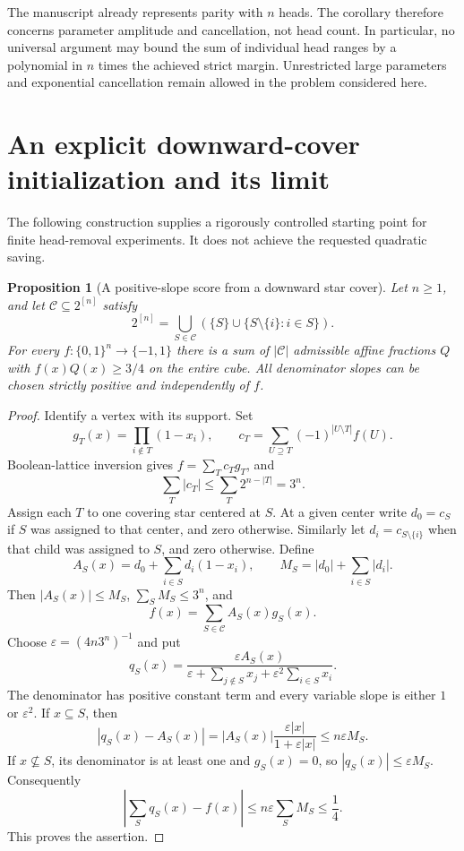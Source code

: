 \documentclass[11pt]{article}
\newtheorem{proposition}{Proposition}
\begin{document}
The manuscript already represents parity with $n$ heads. The corollary
therefore concerns parameter amplitude and cancellation, not head count.
In particular, no universal argument may bound the sum of individual
head ranges by a polynomial in $n$ times the achieved strict margin.
Unrestricted large parameters and exponential cancellation remain allowed
in the problem considered here.

\section{An explicit downward-cover initialization and its limit}

The following construction supplies a rigorously controlled starting point
for finite head-removal experiments. It does not achieve the requested
quadratic saving.

\begin{proposition}[A positive-slope score from a downward star cover]
Let $n\geq1$, and let $\mathcal C\subseteq2^{[n]}$ satisfy
\[
 2^{[n]}=\bigcup_{S\in\mathcal C}
       \left(\{S\}\cup\{S\setminus\{i\}:i\in S\}\right).
\]
For every $f:\{0,1\}^n\longrightarrow\{-1,1\}$ there is a sum
of $|\mathcal C|$ admissible affine fractions $Q$ with
$f(x)Q(x)\geq3/4$ on the entire cube. All denominator slopes
can be chosen strictly positive and independently of $f$.
\end{proposition}

\begin{proof}
Identify a vertex with its support. Set
\[
 g_T(x)=\prod_{i\notin T}(1-x_i),\qquad
 c_T=\sum_{U\supseteq T}(-1)^{|U\setminus T|}f(U).
\]
Boolean-lattice inversion gives $f=\sum_Tc_Tg_T$, and
\[
 \sum_T|c_T|\leq\sum_T2^{n-|T|}=3^n.
\]
Assign each $T$ to one covering star centered at $S$. At a given
center write $d_0=c_S$ if $S$ was assigned to that center, and zero
otherwise. Similarly let $d_i=c_{S\setminus\{i\}}$ when that child
was assigned to $S$, and zero otherwise. Define
\[
 A_S(x)=d_0+\sum_{i\in S}d_i(1-x_i),\qquad
 M_S=|d_0|+\sum_{i\in S}|d_i|.
\]
Then $|A_S(x)|\leq M_S$, $\sum_SM_S\leq3^n$, and
\[
 f(x)=\sum_{S\in\mathcal C} A_S(x)g_S(x).
\]
Choose $\varepsilon=(4n3^n)^{-1}$ and put
\[
 q_S(x)=\frac{\varepsilon A_S(x)}
 {\varepsilon+\sum_{j\notin S}x_j+
                     \varepsilon^2\sum_{i\in S}x_i}.
\]
The denominator has positive constant term and every variable slope
is either $1$ or $\varepsilon^2$. If $x\subseteq S$, then
\[
 |q_S(x)-A_S(x)|
 =|A_S(x)|\frac{\varepsilon|x|}{1+\varepsilon|x|}
 \leq n\varepsilon M_S.
\]
If $x\not\subseteq S$, its denominator is at least one and
$g_S(x)=0$, so $|q_S(x)|\leq\varepsilon M_S$.
Consequently
\[
 \left|\sum_Sq_S(x)-f(x)\right|
 \leq n\varepsilon\sum_SM_S\leq\frac14.
\]
This proves the assertion.
\end{proof}
\end{document}
